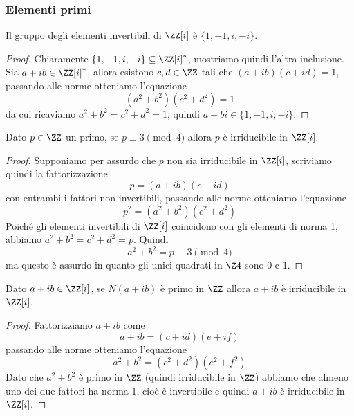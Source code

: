 \documentclass[11pt]{scrartcl}
\begin{document}
\subsubsection{Elementi primi}

\begin{lemma}
    Il gruppo degli elementi invertibili di $\ZZ[i]$ è $\{1, -1, i, -i\}$.
\end{lemma}

\begin{proof}
    Chiaramente $\{1, -1, i, -i\} \subseteq \ZZ[i]^*$, mostriamo quindi l'altra
    inclusione. Sia $a + ib \in \ZZ[i]^*$, allora esistono $c, d \in \ZZ$
    tali che $(a + ib)(c + id) = 1$, passando alle norme otteniamo l'equazione
    \[
        (a^2 + b^2)(c^2 + d^2) = 1
    \]
    da cui ricaviamo $a^2 + b^2 = c^2 + d^2 = 1$, quindi $a + bi \in \{1, -1, i, -i\}$.
\end{proof}

\begin{lemma}
    \label{lemma2.13}
    Dato $p \in \ZZ$ un primo, se $p \equiv 3 \pmod 4$ allora $p$ è irriducibile
    in $\ZZ[i]$.
\end{lemma}

\begin{proof}
    Supponiamo per assurdo che $p$ non sia irriducibile in $\ZZ[i]$, scriviamo quindi
    la fattorizzazione
    \[
        p = (a + ib)(c + id)
    \]
    con entrambi i fattori non invertibili, passando alle norme otteniamo 
    l'equazione
    \[
        p^2 = (a^2 + b^2)(c^2 + d^2)
    \]
    Poiché gli elementi invertibili di $\ZZ[i]$ coincidono con gli elementi di 
    norma 1, abbiamo $a^2 + b^2 = c^2 + d^2 = p$. Quindi 
    \[
        a^2 + b^2 = p \equiv 3 \pmod 4
    \]
    ma questo è assurdo in quanto gli unici quadrati in $\Z4$ sono 0 e 1.
\end{proof}

\begin{lemma}
    \label{lemma2.14}
    Dato $a + ib \in \ZZ[i]$, se $N(a + ib)$ è primo in $\ZZ$ allora $a + ib$
    è irriducibile in $\ZZ[i]$.
\end{lemma}

\begin{proof}
    Fattorizziamo $a + ib$ come 
    \[
        a + ib = (c + id)(e + if)
    \]
    passando alle norme otteniamo l'equazione
    \[
        a^2 + b^2 = (c^2 + d^2)(e^2 + f^2)
    \]
    Dato che $a^2 + b^2$ è primo in $\ZZ$ (quindi irriducibile in $\ZZ$)
    abbiamo che almeno uno dei due fattori ha norma 1, cioè è invertibile e 
    quindi $a + ib$ è irriducibile in $\ZZ[i]$.
\end{proof}
\end{document}
